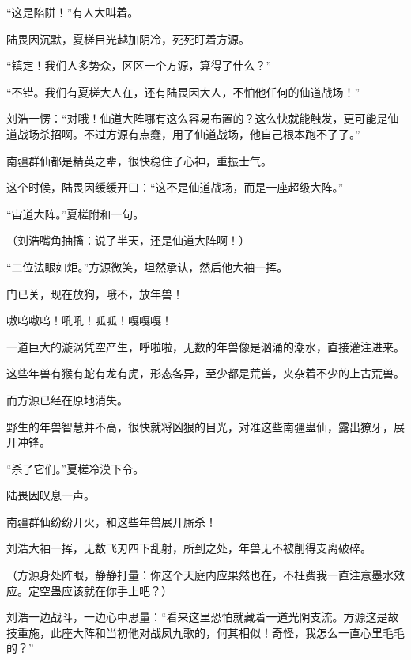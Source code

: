 \begin{this_body}
“这是陷阱！”有人大叫着。

陆畏因沉默，夏槎目光越加阴冷，死死盯着方源。

“镇定！我们人多势众，区区一个方源，算得了什么？”

“不错。我们有夏槎大人在，还有陆畏因大人，不怕他任何的仙道战场！”

刘浩一愣：“对哦！仙道大阵哪有这么容易布置的？这么快就能触发，更可能是仙道战场杀招啊。不过方源有点蠢，用了仙道战场，他自己根本跑不了了。”

南疆群仙都是精英之辈，很快稳住了心神，重振士气。

这个时候，陆畏因缓缓开口：“这不是仙道战场，而是一座超级大阵。”

“宙道大阵。”夏槎附和一句。

（刘浩嘴角抽搐：说了半天，还是仙道大阵啊！）

“二位法眼如炬。”方源微笑，坦然承认，然后他大袖一挥。

门已关，现在放狗，哦不，放年兽！

嗷呜嗷呜！吼吼！呱呱！嘎嘎嘎！

一道巨大的漩涡凭空产生，呼啦啦，无数的年兽像是汹涌的潮水，直接灌注进来。

这些年兽有猴有蛇有龙有虎，形态各异，至少都是荒兽，夹杂着不少的上古荒兽。

而方源已经在原地消失。

野生的年兽智慧并不高，很快就将凶狠的目光，对准这些南疆蛊仙，露出獠牙，展开冲锋。

“杀了它们。”夏槎冷漠下令。

陆畏因叹息一声。

南疆群仙纷纷开火，和这些年兽展开厮杀！

刘浩大袖一挥，无数飞刃四下乱射，所到之处，年兽无不被削得支离破碎。

（方源身处阵眼，静静打量：你这个天庭内应果然也在，不枉费我一直注意墨水效应。定空蛊应该就在你手上吧？）

刘浩一边战斗，一边心中思量：“看来这里恐怕就藏着一道光阴支流。方源这是故技重施，此座大阵和当初他对战凤九歌的，何其相似！奇怪，我怎么一直心里毛毛的？”

\end{this_body}

